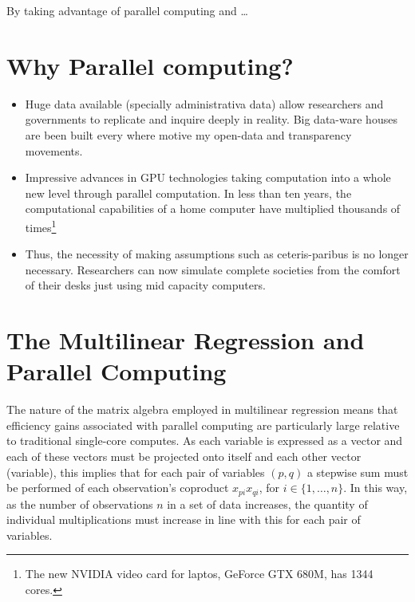 \documentclass{article}[11pt,subeqn]
\begin{document}
\begin{spacing}{1.25}
By taking advantage of parallel computing and \ldots


\section{Why Parallel computing?}

\begin{itemize}
\item Huge data available (specially administrativa data) allow researchers and governments to replicate and inquire deeply in reality. Big data-ware houses are been built every where motive my open-data and transparency movements.
\item Impressive advances in GPU technologies taking computation into a whole new level through parallel computation. In less than ten years, the computational capabilities of a home computer have multiplied thousands of times\footnote{The new NVIDIA video card for laptos, GeForce GTX 680M, has 1344 cores.} 
\item Thus, the necessity of making assumptions such as ceteris-paribus is no longer necessary. Researchers can now simulate complete societies from the comfort of their desks just using mid capacity computers.
\end{itemize}

\section{The Multilinear Regression and Parallel Computing}
The nature of the matrix algebra employed in multilinear regression means that efficiency gains associated with parallel computing are particularly 
large relative to traditional single-core computes.  As each variable is expressed as a vector and each of these vectors must be projected onto itself 
and each other vector (variable), this implies that for each pair of variables $(p,q)$ a stepwise sum must be performed of each observation's coproduct 
$x_{pi}x_{qi}$, for $i\in \{1,\ldots,n\}$.  In this way, as the number of observations $n$ in a set of data increases, the quantity of individual 
multiplications must increase in line with this for each pair of variables.


\end{spacing}
\end{document}
